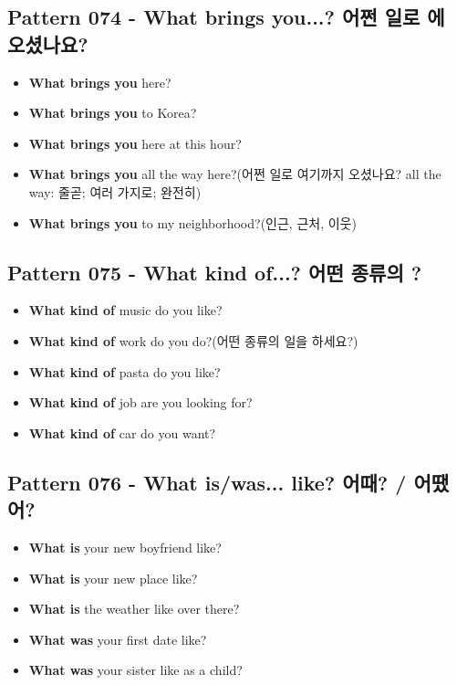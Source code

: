 \documentclass[11pt]{oblivoir}
\begin{document}
\subsection{Pattern 074 - What brings you...? 어쩐 일로 \texttildelow 에 오셨나요?}
\begin{itemize}
  \item \textbf{What brings you} here?
  \item \textbf{What brings you} to Korea?
  \item \textbf{What brings you} here at this hour?
  \item \textbf{What brings you} all the way here?(어쩐 일로 여기까지 오셨나요? all the way: 줄곧; 여러 가지로; 완전히)
  \item \textbf{What brings you} to my neighborhood?(인근, 근처, 이웃)
\end{itemize}

\subsection{Pattern 075 - What kind of...? 어떤 종류의 \texttildelow ?}
\begin{itemize}
  \item \textbf{What kind of} music do you like?
  \item \textbf{What kind of} work do you do?(어떤 종류의 일을 하세요?)
  \item \textbf{What kind of} pasta do you like?
  \item \textbf{What kind of} job are you looking for?
  \item \textbf{What kind of} car do you want?
\end{itemize}

\subsection{Pattern 076 - What is/was... like? \texttildelow 어때? / \texttildelow 어땠어?}
\begin{itemize}
  \item \textbf{What is} your new boyfriend like?
  \item \textbf{What is} your new place like?
  \item \textbf{What is} the weather like over there?
  \item \textbf{What was} your first date like?
  \item \textbf{What was} your sister like as a child?
\end{itemize}
\end{document}

